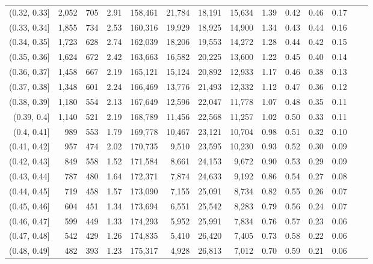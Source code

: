 \begin{tabular}{rrrrrrrrrrrrrr}
(0.32, 0.33]   &  2,052 &  705 &    2.91 &  158,461 &   21,784 &  18,191 &  15,634 &  1.39 &  0.42 &  0.46 &      0.17 \\
(0.33, 0.34]   &  1,855 &  734 &    2.53 &  160,316 &   19,929 &  18,925 &  14,900 &  1.34 &  0.43 &  0.44 &      0.16 \\
(0.34, 0.35]   &  1,723 &  628 &    2.74 &  162,039 &   18,206 &  19,553 &  14,272 &  1.28 &  0.44 &  0.42 &      0.15 \\
(0.35, 0.36]   &  1,624 &  672 &    2.42 &  163,663 &   16,582 &  20,225 &  13,600 &  1.22 &  0.45 &  0.40 &      0.14 \\
(0.36, 0.37]   &  1,458 &  667 &    2.19 &  165,121 &   15,124 &  20,892 &  12,933 &  1.17 &  0.46 &  0.38 &      0.13 \\
(0.37, 0.38]   &  1,348 &  601 &    2.24 &  166,469 &   13,776 &  21,493 &  12,332 &  1.12 &  0.47 &  0.36 &      0.12 \\
(0.38, 0.39]   &  1,180 &  554 &    2.13 &  167,649 &   12,596 &  22,047 &  11,778 &  1.07 &  0.48 &  0.35 &      0.11 \\
(0.39, 0.4]    &  1,140 &  521 &    2.19 &  168,789 &   11,456 &  22,568 &  11,257 &  1.02 &  0.50 &  0.33 &      0.11 \\
(0.4, 0.41]    &    989 &  553 &    1.79 &  169,778 &   10,467 &  23,121 &  10,704 &  0.98 &  0.51 &  0.32 &      0.10 \\
(0.41, 0.42]   &    957 &  474 &    2.02 &  170,735 &    9,510 &  23,595 &  10,230 &  0.93 &  0.52 &  0.30 &      0.09 \\
(0.42, 0.43]   &    849 &  558 &    1.52 &  171,584 &    8,661 &  24,153 &   9,672 &  0.90 &  0.53 &  0.29 &      0.09 \\
(0.43, 0.44]   &    787 &  480 &    1.64 &  172,371 &    7,874 &  24,633 &   9,192 &  0.86 &  0.54 &  0.27 &      0.08 \\
(0.44, 0.45]   &    719 &  458 &    1.57 &  173,090 &    7,155 &  25,091 &   8,734 &  0.82 &  0.55 &  0.26 &      0.07 \\
(0.45, 0.46]   &    604 &  451 &    1.34 &  173,694 &    6,551 &  25,542 &   8,283 &  0.79 &  0.56 &  0.24 &      0.07 \\
(0.46, 0.47]   &    599 &  449 &    1.33 &  174,293 &    5,952 &  25,991 &   7,834 &  0.76 &  0.57 &  0.23 &      0.06 \\
(0.47, 0.48]   &    542 &  429 &    1.26 &  174,835 &    5,410 &  26,420 &   7,405 &  0.73 &  0.58 &  0.22 &      0.06 \\
(0.48, 0.49]   &    482 &  393 &    1.23 &  175,317 &    4,928 &  26,813 &   7,012 &  0.70 &  0.59 &  0.21 &      0.06 \\

\end{tabular}
